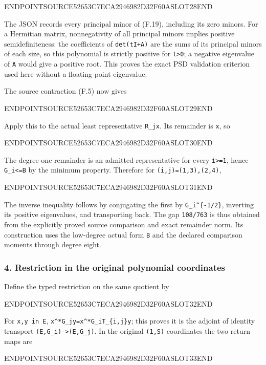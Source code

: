 ENDPOINTSOURCE52653C7ECA2946982D32F60ASLOT28END

The JSON records every principal minor of (F.19), including its zero minors. For a Hermitian matrix, nonnegativity of all principal minors implies positive semidefiniteness: the coefficients of \texttt{det(tI+A)} are the sums of its principal minors of each size, so this polynomial is strictly positive for \texttt{t\textgreater{}0}; a negative eigenvalue of \texttt{A} would give a positive root. This proves the exact PSD validation criterion used here without a floating-point eigenvalue.

The source contraction (F.5) now gives

ENDPOINTSOURCE52653C7ECA2946982D32F60ASLOT29END

Apply this to the actual least representative \texttt{R\_jx}. Its remainder is \texttt{x}, so

ENDPOINTSOURCE52653C7ECA2946982D32F60ASLOT30END

The degree-one remainder is an admitted representative for every \texttt{i\textgreater{}=1}, hence \texttt{G\_i\textless{}=B} by the minimum property. Therefore for \texttt{(i,j)=(1,3),(2,4)},

ENDPOINTSOURCE52653C7ECA2946982D32F60ASLOT31END

The inverse inequality follows by conjugating the first by \texttt{G\_i\^{}\{-1/2\}}, inverting its positive eigenvalues, and transporting back. The gap \texttt{108/763} is thus obtained from the explicitly proved source comparison and exact remainder norm. Its construction uses the low-degree actual form \texttt{B} and the declared comparison moments through degree eight.

\subsubsection{4. Restriction in the original polynomial coordinates}\label{endpoint-restriction_fixture--restriction-in-the-original-polynomial-coordinates}

Define the typed restriction on the same quotient by

ENDPOINTSOURCE52653C7ECA2946982D32F60ASLOT32END

For \texttt{x,y\ in\ E}, \texttt{x\^{}*G\_jy=x\^{}*G\_iT\_\{i,j\}y}; this proves it is the adjoint of identity transport \texttt{(E,G\_i)-\textgreater{}(E,G\_j)}. In the original \texttt{(1,S)} coordinates the two return maps are

ENDPOINTSOURCE52653C7ECA2946982D32F60ASLOT33END

